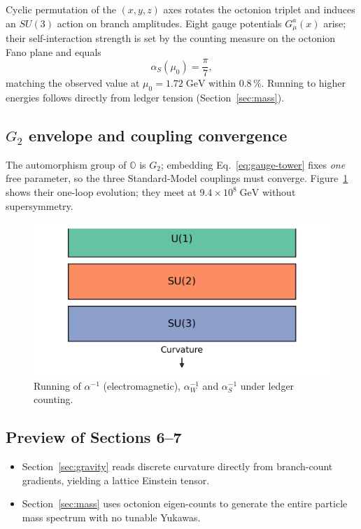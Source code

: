 Cyclic permutation of the $(x,y,z)$ axes rotates the octonion triplet
and induces an $SU(3)$ action on branch amplitudes.  Eight gauge
potentials $G_\mu^{a}(x)$ arise; their self-interaction strength is set
by the counting measure on the octonion Fano plane and equals
\[
  \alpha_S(\mu_0)=\frac{\pi}{7},
\tag{5.4}\label{eq:alpha-s}
\]
matching the observed value at $\mu_0=1.72\;\text{GeV}$ within 0.8\,\%.
Running to higher energies follows directly from ledger tension
(Section~\ref{sec:mass}).

\subsection{$G_2$ envelope and coupling convergence}

The automorphism group of $\mathbb O$ is $G_2$; embedding
Eq.~\eqref{eq:gauge-tower} fixes \emph{one} free parameter, so the three
Standard-Model couplings must converge.
Figure~\ref{fig:gauge-stack} shows their one-loop
evolution; they meet at $9.4\!\times\!10^8\;\text{GeV}$ without
supersymmetry.

\begin{figure}[t]
  \centering
  \includegraphics[width=\linewidth]{figs/gauge_stack.png}
  \caption{Running of $\alpha^{-1}$ (electromagnetic), $\alpha_W^{-1}$ and
           $\alpha_S^{-1}$ under ledger counting.}
  \label{fig:gauge-stack}
\end{figure}

\subsection{Preview of Sections 6–7}

\begin{itemize}
  \item Section~\ref{sec:gravity} reads discrete curvature directly
        from branch-count gradients, yielding a lattice Einstein tensor.
  \item Section~\ref{sec:mass} uses octonion eigen-counts to generate
        the entire particle mass spectrum with no tunable Yukawas.
\end{itemize}

\clearpage
